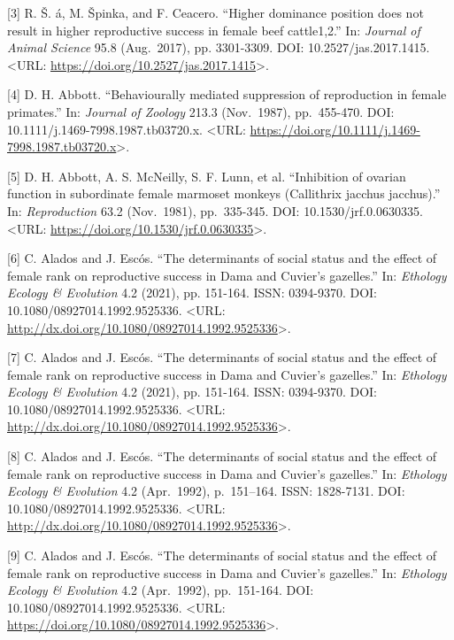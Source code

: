 \documentclass[
]{article}
\begin{document}
{[}3{]} R. Š. á, M. Špinka, and F. Ceacero. ``Higher dominance position
does not result in higher reproductive success in female beef
cattle1,2.'' In: \emph{Journal of Animal Science} 95.8 (Aug.~2017), pp.
3301-3309. DOI: 10.2527/jas.2017.1415. \textless URL:
\url{https://doi.org/10.2527/jas.2017.1415}\textgreater.

{[}4{]} D. H. Abbott. ``Behaviourally mediated suppression of
reproduction in female primates.'' In: \emph{Journal of Zoology} 213.3
(Nov.~1987), pp.~455-470. DOI: 10.1111/j.1469-7998.1987.tb03720.x.
\textless URL:
\url{https://doi.org/10.1111/j.1469-7998.1987.tb03720.x}\textgreater.

{[}5{]} D. H. Abbott, A. S. McNeilly, S. F. Lunn, et al. ``Inhibition of
ovarian function in subordinate female marmoset monkeys (Callithrix
jacchus jacchus).'' In: \emph{Reproduction} 63.2 (Nov.~1981),
pp.~335-345. DOI: 10.1530/jrf.0.0630335. \textless URL:
\url{https://doi.org/10.1530/jrf.0.0630335}\textgreater.

{[}6{]} C. Alados and J. Escós. ``The determinants of social status and
the effect of female rank on reproductive success in Dama and Cuvier's
gazelles.'' In: \emph{Ethology Ecology \& Evolution} 4.2 (2021), pp.
151-164. ISSN: 0394-9370. DOI: 10.1080/08927014.1992.9525336.
\textless URL:
\url{http://dx.doi.org/10.1080/08927014.1992.9525336}\textgreater.

{[}7{]} C. Alados and J. Escós. ``The determinants of social status and
the effect of female rank on reproductive success in Dama and Cuvier's
gazelles.'' In: \emph{Ethology Ecology \& Evolution} 4.2 (2021), pp.
151-164. ISSN: 0394-9370. DOI: 10.1080/08927014.1992.9525336.
\textless URL:
\url{http://dx.doi.org/10.1080/08927014.1992.9525336}\textgreater.

{[}8{]} C. Alados and J. Escós. ``The determinants of social status and
the effect of female rank on reproductive success in Dama and Cuvier's
gazelles.'' In: \emph{Ethology Ecology \& Evolution} 4.2 (Apr.~1992),
p.~151--164. ISSN: 1828-7131. DOI: 10.1080/08927014.1992.9525336.
\textless URL:
\url{http://dx.doi.org/10.1080/08927014.1992.9525336}\textgreater.

{[}9{]} C. Alados and J. Escós. ``The determinants of social status and
the effect of female rank on reproductive success in Dama and Cuvier's
gazelles.'' In: \emph{Ethology Ecology \& Evolution} 4.2 (Apr.~1992),
pp.~151-164. DOI: 10.1080/08927014.1992.9525336. \textless URL:
\url{https://doi.org/10.1080/08927014.1992.9525336}\textgreater.
\end{document}
